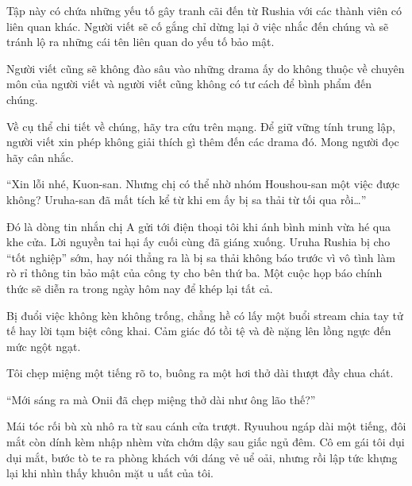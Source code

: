 \documentclass[../main.tex]{subfiles}
\begin{document}

 Tập này có chứa những yếu tố gây tranh cãi đến từ Rushia với các thành viên có liên quan khác. Người viết sẽ cố gắng chỉ dừng lại ở việc nhắc đến chúng và sẽ tránh lộ ra những cái tên liên quan do yếu tố bảo mật.

Người viết cũng sẽ không đào sâu vào những drama ấy do không thuộc về chuyên môn của người viết và người viết cũng không có tư cách để bình phẩm đến chúng.

Về cụ thể chi tiết về chúng, hãy tra cứu trên mạng. Để giữ vững tính trung lập, người viết xin phép không giải thích gì thêm đến các drama đó. Mong người đọc hãy cân nhắc.

\il


``Xin lỗi nhé, Kuon-san. Nhưng chị có thể nhờ nhóm Houshou-san một việc được không? Uruha-san đã mất tích kể từ khi em ấy bị sa thải từ tối qua rồi\dots''

Đó là dòng tin nhắn chị A gửi tới điện thoại tôi khi ánh bình minh vừa hé qua khe cửa. Lời nguyền tai hại ấy cuối cùng đã giáng xuống. Uruha Rushia bị cho ``tốt nghiệp'' sớm, hay nói thẳng ra là bị sa thải không báo trước vì vô tình làm rò rỉ thông tin bảo mật của công ty cho bên thứ ba. Một cuộc họp báo chính thức sẽ diễn ra trong ngày hôm nay để khép lại tất cả.

Bị đuổi việc không kèn không trống, chẳng hề có lấy một buổi stream chia tay tử tế hay lời tạm biệt công khai. Cảm giác đó tồi tệ và đè nặng lên lồng ngực đến mức ngột ngạt.

Tôi chẹp miệng một tiếng rõ to, buông ra một hơi thở dài thượt đầy chua chát.

``Mới sáng ra mà Onii đã chẹp miệng thở dài như ông lão thế?''

Mái tóc rối bù xù nhô ra từ sau cánh cửa trượt. Ryuuhou ngáp dài một tiếng, đôi mắt còn dính kèm nhập nhèm vừa chớm dậy sau giấc ngủ đêm. Cô em gái tôi dụi dụi mắt, bước tò te ra phòng khách với dáng vẻ uể oải, nhưng rồi lập tức khựng lại khi nhìn thấy khuôn mặt u uất của tôi.
\end{document}
